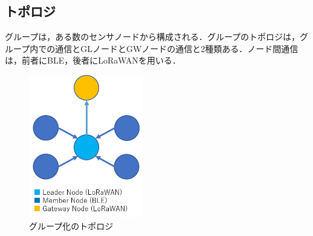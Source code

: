 \subsection{トポロジ}
グループは，ある数のセンサノードから構成される．グループのトポロジは，グループ内での通信とGLノードとGWノードの通信と2種類ある．ノード間通信は，前者にBLE，後者にLoRaWANを用いる．

\begin{figure}[]
    \begin{center}
    \includegraphics[width=5cm]{figures/グループ化のトポロジ.png}
    \caption{グループ化のトポロジ}
    \label{fig:group_topology}
    \end{center}
\end{figure}